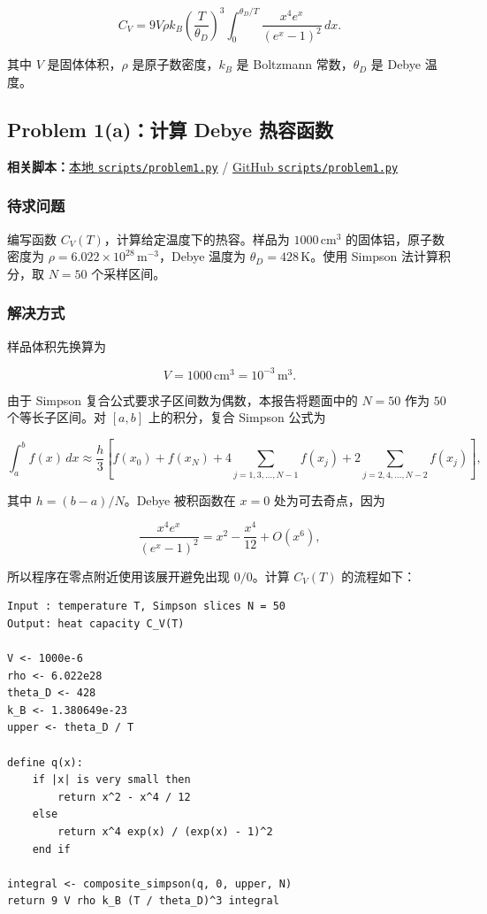 \documentclass[12pt,a4paper,fontset=none]{ctexart}
\newcommand{\fileinline}[1]{{\urlstyle{same}\nolinkurl{#1}}}
\newcommand{\metadataline}[1]{#1}
\newcommand{\scriptpath}[1]{\fileinline{#1}}
\newcommand{\githubscriptsbase}{https://github.com/Void0312Aurora/computational-physics-homework-2026/blob/main/07/scripts}
\newcommand{\scriptlink}[1]{\noindent\metadataline{\textbf{相关脚本：}\href{../../../scripts/#1}{本地 \scriptpath{scripts/#1}} / \href{\githubscriptsbase/#1}{GitHub \scriptpath{scripts/#1}}}\par\medskip}
\begin{document}
\[
C_V=9V\rho k_B\left(\frac{T}{\theta_D}\right)^3
\int_0^{\theta_D/T}\frac{x^4e^x}{(e^x-1)^2}\,dx.
\]

其中 \(V\) 是固体体积，\(\rho\) 是原子数密度，\(k_B\) 是 Boltzmann 常数，\(\theta_D\) 是 Debye 温度。

\subsection{Problem 1(a)：计算 Debye 热容函数}\label{problem-1a}

\scriptlink{problem1.py}

\subsubsection{待求问题}\label{ux5f85ux6c42ux95eeux9898}

编写函数 \(C_V(T)\)，计算给定温度下的热容。样品为 \(1000\,\mathrm{cm^3}\) 的固体铝，原子数密度为 \(\rho=6.022\times10^{28}\,\mathrm{m^{-3}}\)，Debye 温度为 \(\theta_D=428\,\mathrm{K}\)。使用 Simpson 法计算积分，取 \(N=50\) 个采样区间。

\subsubsection{解决方式}\label{ux89e3ux51b3ux65b9ux5f0f}

样品体积先换算为

\[
V=1000\,\mathrm{cm^3}=10^{-3}\,\mathrm{m^3}.
\]

由于 Simpson 复合公式要求子区间数为偶数，本报告将题面中的 \(N=50\) 作为 \(50\) 个等长子区间。对 \([a,b]\) 上的积分，复合 Simpson 公式为

\[
\int_a^b f(x)\,dx
\approx
\frac{h}{3}\left[f(x_0)+f(x_N)
+4\sum_{j=1,3,\ldots,N-1}f(x_j)
+2\sum_{j=2,4,\ldots,N-2}f(x_j)\right],
\]

其中 \(h=(b-a)/N\)。Debye 被积函数在 \(x=0\) 处为可去奇点，因为

\[
\frac{x^4e^x}{(e^x-1)^2}=x^2-\frac{x^4}{12}+O(x^6),
\]

所以程序在零点附近使用该展开避免出现 \(0/0\)。计算 \(C_V(T)\) 的流程如下：

\begin{verbatim}
Input : temperature T, Simpson slices N = 50
Output: heat capacity C_V(T)

V <- 1000e-6
rho <- 6.022e28
theta_D <- 428
k_B <- 1.380649e-23
upper <- theta_D / T

define q(x):
    if |x| is very small then
        return x^2 - x^4 / 12
    else
        return x^4 exp(x) / (exp(x) - 1)^2
    end if

integral <- composite_simpson(q, 0, upper, N)
return 9 V rho k_B (T / theta_D)^3 integral
\end{verbatim}
\end{document}
